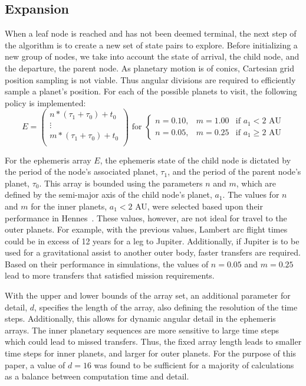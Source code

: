 \documentclass[letterpaper, paper,11pt]{AAS}	%
\begin{document}
\subsection{Expansion}
When a leaf node is reached and has not been deemed terminal, the next step of the algorithm is to create a new set of state pairs to explore. Before initializing a new group of nodes, we take into account the state of arrival, the child node, and the departure, the parent node. As planetary motion is of conics, Cartesian grid position sampling is not viable. Thus angular divisions are required to efficiently sample a planet's position. For each of the possible planets to visit, the following policy is implemented:
\begin{equation*}
    \label{eq:ephemArray}
    E =
    \left(\begin{array}{c}
        n*(\tau_1 + \tau_0) + t_0 \\
        \vdots \\
        m*(\tau_1 + \tau_0) + t_0 \\
    \end{array}\right)
    \text{ for }
    \left\{\begin{array}{lll}
        n = 0.10, & m = 1.00 &\text{if } a_1 < 2 \text{ AU} \\
        n = 0.05, & m = 0.25 &\text{if } a_1 \geq 2 \text{ AU}
    \end{array}\right.
\end{equation*}

For the ephemeris array $E$, the ephemeris state of the child node is dictated by the period of the node's associated planet, $\tau_1$, and the period of the parent node's planet, $\tau_0$. This array is bounded using the parameters $n$ and $m$, which are defined by the semi-major axis of the child node's planet, $a_1$. The values for $n$ and $m$ for the inner planets, $a_1 < 2$ AU, were selected based upon their performance in Hennes~\cite{Hennes2015}. These values, however, are not ideal for travel to the outer planets. For example, with the previous values, Lambert arc flight times could be in excess of 12 years for a leg to Jupiter. Additionally, if Jupiter is to be used for a gravitational assist to another outer body, faster transfers are required. Based on their performance in simulations, the values of $n = 0.05$ and $m = 0.25$ lead to more transfers that satisfied mission requirements.

With the upper and lower bounds of the array set, an additional parameter for detail, $d$, specifies the length of the array, also defining the resolution of the time steps. Additionally, this allows for dynamic angular detail in the ephemeris arrays. The inner planetary sequences are more sensitive to large time steps which could lead to missed transfers. Thus, the fixed array length leads to smaller time steps for inner planets, and larger for outer planets. For the purpose of this paper, a value of $d = 16$ was found to be sufficient for a majority of calculations as a balance between computation time and detail.
\end{document}

